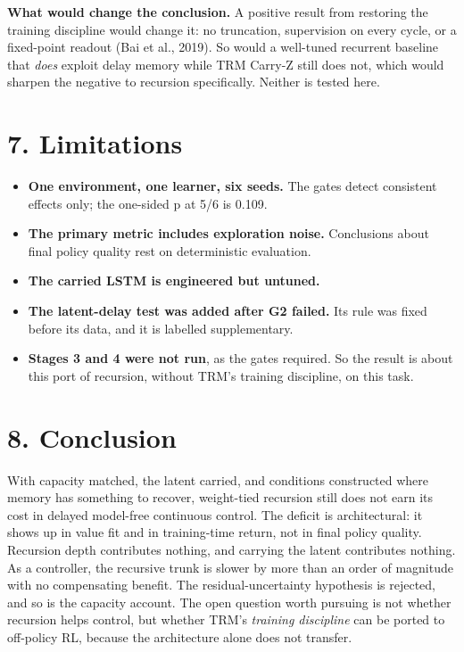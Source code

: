 \documentclass[11pt]{article}
\begin{document}
\textbf{What would change the conclusion.} A positive result from restoring the training discipline would change it: no truncation, supervision on every cycle, or a fixed-point readout (Bai et al., 2019). So would a well-tuned recurrent baseline that \emph{does} exploit delay memory while TRM Carry-Z still does not, which would sharpen the negative to recursion specifically. Neither is tested here.



\section*{7. Limitations}



\begin{itemize}
\item \textbf{One environment, one learner, six seeds.} The gates detect consistent effects only; the one-sided p at 5/6 is 0.109.
\item \textbf{The primary metric includes exploration noise.} Conclusions about final policy quality rest on deterministic evaluation.
\item \textbf{The carried LSTM is engineered but untuned.}
\item \textbf{The latent-delay test was added after G2 failed.} Its rule was fixed before its data, and it is labelled supplementary.
\item \textbf{Stages 3 and 4 were not run}, as the gates required. So the result is about this port of recursion, without TRM's training discipline, on this task.
\end{itemize}



\section*{8. Conclusion}



With capacity matched, the latent carried, and conditions constructed where memory has something to recover, weight-tied recursion still does not earn its cost in delayed model-free continuous control. The deficit is architectural: it shows up in value fit and in training-time return, not in final policy quality. Recursion depth contributes nothing, and carrying the latent contributes nothing. As a controller, the recursive trunk is slower by more than an order of magnitude with no compensating benefit. The residual-uncertainty hypothesis is rejected, and so is the capacity account. The open question worth pursuing is not whether recursion helps control, but whether TRM's \emph{training discipline} can be ported to off-policy RL, because the architecture alone does not transfer.
\end{document}
